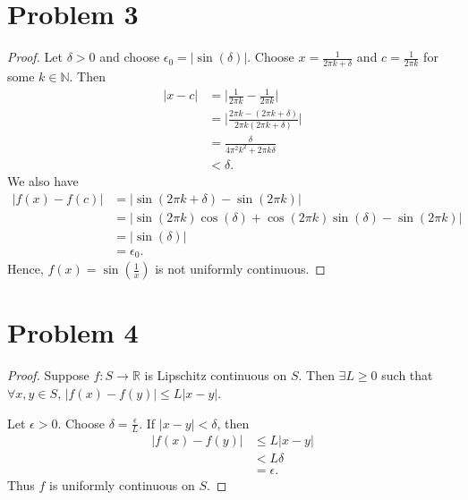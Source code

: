 \documentclass{article}
\newcommand{\R}{\mathbb{R}} %
\newcommand{\N}{\mathbb{N}} %
\begin{document}
\section*{Problem 3}
\begin{proof}
	Let $\delta > 0$ and choose $\epsilon_0 = |\sin(\delta)|$. Choose $x = \frac{1}{2\pi k + \delta}$ and $c = \frac{1}{2 \pi k}$ for some $k \in \N$. Then
	\begin{align}
		|x - c| &= \Big|\frac{1}{2 \pi k} - \frac{1}{2 \pi k}\Big| \\
		&= \Big|\frac{2 \pi k - (2 \pi k + \delta)}{2 \pi k (2 \pi k + \delta)}\Big| \\
		&= \frac{\delta}{4 \pi^2 k^2 + 2 \pi k \delta} \\
		&< \delta.
	\end{align}
	We also have
	\begin{align}
		|f(x) - f(c)| &= |\sin(2 \pi k + \delta) - \sin(2 \pi k)| \\
		&= |\sin(2 \pi k)\cos(\delta) + \cos(2 \pi k)\sin(\delta) - \sin(2 \pi k)| \\
		&= |\sin(\delta)| \\
		&= \epsilon_0.
	\end{align}
	Hence, $f(x) = \sin\left(\frac{1}{x}\right)$ is not uniformly continuous.
\end{proof}
\section*{Problem 4}
\begin{proof}
	Suppose $f: S \to \R$ is Lipschitz continuous on $S$. Then $\exists L \geq 0$ such that $\forall x, y \in S$, $|f(x) - f(y)| \leq L |x - y|$.
	
	Let $\epsilon > 0$. Choose $\delta = \frac{\epsilon}{L}$. If $|x - y| < \delta$, then
	\begin{align}
		|f(x) - f(y)| &\leq L|x - y| \\
		& < L \delta \\
		&= \epsilon.
	\end{align}
	Thus $f$ is uniformly continuous on $S$. 
\end{proof}
\end{document}
